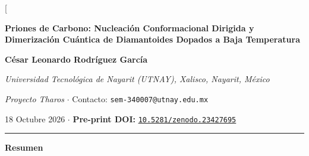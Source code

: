 \documentclass[10pt,twocolumn,a4paper]{article}
\begin{document}
\twocolumn[
  \begin{@twocolumnfalse}
    \vspace{-0.5cm}
    {\centering
      {\LARGE \textbf{Priones de Carbono: Nucleación Conformacional Dirigida y Dimerización Cuántica de Diamantoides Dopados a Baja Temperatura} \par}
      \vspace{0.85em}
      {\large \textbf{César Leonardo Rodríguez García} \par}
      \vspace{0.3em}
      {\small \textit{Universidad Tecnológica de Nayarit (UTNAY), Xalisco, Nayarit, México} \par}
      \vspace{0.15em}
      {\footnotesize \textit{Proyecto Tharos} $\cdot$ Contacto: \texttt{sem-340007@utnay.edu.mx} \par}
      \vspace{0.25em}
      {\footnotesize 18 Octubre 2026 $\cdot$ \textbf{Pre-print DOI:} \href{https://doi.org/10.5281/zenodo.23427695}{\texttt{10.5281/zenodo.23427695}} \par}
      \vspace{0.65em}
    }
    \hrule
    \vspace{0.55em}
    \noindent\textbf{\large Resumen}
    \vspace{0.35em}


\end{@twocolumnfalse}
\end{document}
